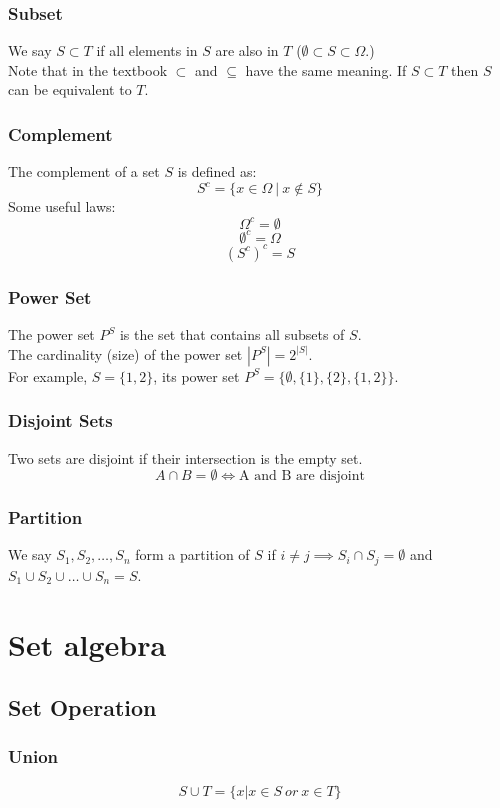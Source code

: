 \documentclass[11pt]{article}
\begin{document}
\subsubsection{Subset}
We say $S \subset T$ if all elements in $S$ are also in $T$ ($\emptyset \subset S \subset \Omega$.)
\\ \noindent Note that in the textbook $\subset$ and $\subseteq$ have the same meaning. If $S \subset T$ then $S$ can be equivalent to $T$.

\subsubsection{Complement}
The complement of a set $S$ is defined as:
$$ S^{c} = \{ x \in \Omega \: | \: x \notin S \} $$
Some useful laws:
 $$ \Omega^{c} = \emptyset $$
 $$ \emptyset^{c} = \Omega $$
 $$ (S^{c})^{c} = S $$
\subsubsection{Power Set}
The power set $P^{S}$ is the set that contains all subsets of $S$. \\
\noindent The cardinality (size) of the power set $|P^{S}| = 2^{|S|}$. \\
\noindent For example, $S = \{1,2\}$, its power set $P^{S} = \{\emptyset, \{1\}, \{2\}, \{1,2\} \}$.

\subsubsection{Disjoint Sets}
Two sets are disjoint if their intersection is the empty set.
$$ A \cap B = \emptyset \iff \text{A and B are disjoint}$$
\subsubsection{Partition}
We say $S_1, S_2, \ldots, S_n $ form a partition of $S$ if $i \neq j \implies S_i \cap S_j = \emptyset$ and $S_1 \cup S_2 \cup \ldots \cup S_n = S$.

\section{Set algebra}
\subsection{Set Operation}
\subsubsection{Union}
$$ S \cup T =  \{ x | x \in S \: or \: x \in T \}$$
\end{document}
